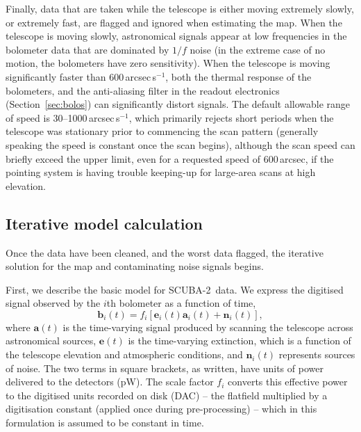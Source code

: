 \documentclass[useAMS,usenatbib,nofootinbib]{mn2e}
\newcommand{\scuba}{SCUBA-2}
\begin{document}
Finally, data that are taken while the telescope is either moving
extremely slowly, or extremely fast, are flagged and ignored when
estimating the map. When the telescope is moving slowly, astronomical
signals appear at low frequencies in the bolometer data that are
dominated by $1/f$ noise (in the extreme case of no motion, the
bolometers have zero sensitivity). When the telescope is moving
significantly faster than 600\,arcsec\,s$^{-1}$, both the thermal
response of the bolometers, and the anti-aliasing filter in the
readout electronics (Section~\ref{sec:bolos}) can significantly
distort signals.  The default allowable range of speed is
30--1000\,arcsec\,s$^{-1}$, which primarily rejects short periods when
the telescope was stationary prior to commencing the scan pattern
(generally speaking the speed is constant once the scan begins),
although the scan speed can briefly exceed the upper limit, even for a
requested speed of 600\,arcsec, if the pointing system is having
trouble keeping-up for large-area scans at high elevation.

\subsection{Iterative model calculation}
\label{sec:components}

Once the data have been cleaned, and the worst data flagged, the
iterative solution for the map and contaminating noise signals begins.

First, we describe the basic model for \scuba\ data. We express the
digitised signal observed by the $i$th bolometer as a function of
time,
%
\begin{equation}
\mathbf{b}_i(t) = f_i[\mathbf{e}_i(t) \mathbf{a}_i(t) + \mathbf{n}_i(t)],
\label{eq:model}
\end{equation}
%
where $\mathbf{a}(t)$ is the time-varying signal produced by scanning
the telescope across astronomical sources, $\mathbf{e}(t)$ is the
time-varying extinction, which is a function of the telescope
elevation and atmospheric conditions, and $\mathbf{n}_i(t)$ represents
sources of noise. The two terms in square brackets, as written, have
units of power delivered to the detectors (pW). The scale factor $f_i$
converts this effective power to the digitised units recorded on disk
(DAC) -- the flatfield multiplied by a digitisation constant (applied
once during pre-processing) -- which in this formulation is assumed to
be constant in time.
\end{document}
